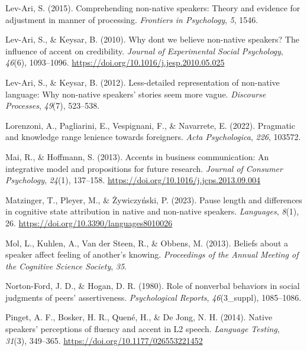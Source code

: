 \documentclass[
  man,floatsintext]{apa7}
\newlength{\cslhangindent}
\newlength{\cslentryspacingunit} %
\newenvironment{CSLReferences}[2] %
 {%
  \setlength{\parindent}{0pt}
  \ifodd #1
  \let\oldpar\par
  \def\par{\hangindent=\cslhangindent\oldpar}
  \fi
  \setlength{\parskip}{#2\cslentryspacingunit}
 }%
 {}
\begin{document}
\begin{CSLReferences}{1}{0}
\leavevmode{}%
Lev-Ari, S. (2015). Comprehending non-native speakers: Theory and evidence for adjustment in manner of processing. \emph{Frontiers in Psychology}, \emph{5}, 1546.

\leavevmode{}%
Lev-Ari, S., \& Keysar, B. (2010). Why don{\textquotesingle}t we believe non-native speakers? {The influence of accent on credibility}. \emph{Journal of Experimental Social Psychology}, \emph{46}(6), 1093--1096. \url{https://doi.org/10.1016/j.jesp.2010.05.025}

\leavevmode{}%
Lev-Ari, S., \& Keysar, B. (2012). Less-detailed representation of non-native language: Why non-native speakers' stories seem more vague. \emph{Discourse Processes}, \emph{49}(7), 523--538.

\leavevmode{}%
Lorenzoni, A., Pagliarini, E., Vespignani, F., \& Navarrete, E. (2022). Pragmatic and knowledge range lenience towards foreigners. \emph{Acta Psychologica}, \emph{226}, 103572.

\leavevmode{}%
Mai, R., \& Hoffmann, S. (2013). Accents in business communication: An integrative model and propositions for future research. \emph{Journal of Consumer Psychology}, \emph{24}(1), 137--158. \url{https://doi.org/10.1016/j.jcps.2013.09.004}

\leavevmode{}%
Matzinger, T., Pleyer, M., \& Żywiczyński, P. (2023). Pause length and differences in cognitive state attribution in native and non-native speakers. \emph{Languages}, \emph{8}(1), 26. \url{https://doi.org/10.3390/languages8010026}

\leavevmode{}%
Mol, L., Kuhlen, A., Van der Steen, R., \& Obbens, M. (2013). Beliefs about a speaker affect feeling of another's knowing. \emph{Proceedings of the Annual Meeting of the Cognitive Science Society}, \emph{35}.

\leavevmode{}%
Norton-Ford, J. D., \& Hogan, D. R. (1980). Role of nonverbal behaviors in social judgments of peers' assertiveness. \emph{Psychological Reports}, \emph{46}(3\_suppl), 1085--1086.

\leavevmode{}%
Pinget, A. F., Bosker, H. R., Quené, H., \& De Jong, N. H. (2014). Native speakers' perceptions of fluency and accent in {L2} speech. \emph{Language Testing}, \emph{31}(3), 349--365. \url{https://doi.org/10.1177/026553221452}


\end{CSLReferences}
\end{document}
